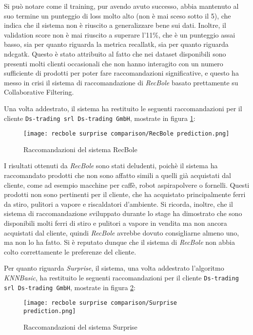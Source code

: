 Si può notare come il training, pur avendo avuto successo, abbia mantenuto al suo termine un punteggio di loss molto alto (non è mai sceso sotto il 5), che indica che il sistema non è riuscito a generalizzare bene sui dati. Inoltre, il validation score non è mai riuscito a superare l'11\%, che è un punteggio assai basso, sia per quanto riguarda la metrica \gls{recallatk}, sia per quanto riguarda \gls{ndcgatk}. Questo è stato attribuito al fatto che nei dataset disponibili sono presenti molti clienti occasionali che non hanno interagito con un numero sufficiente di prodotti per poter fare raccomandazioni significative, e questo ha messo in crisi il sistema di raccomandazione di \emph{RecBole} basato prettamente su Collaborative Filtering.

Una volta addestrato, il sistema ha restituito le seguenti raccomandazioni per il cliente \texttt{Ds-trading srl Ds-trading GmbH}, mostrate in figura \ref{fig:recbole-recommendations}:

\begin{figure}[h]
    \centering
    \texttt{[image: recbole surprise comparison/RecBole prediction.png]}
    \caption{Raccomandazioni del sistema RecBole}
    \label{fig:recbole-recommendations}
\end{figure}

I risultati ottenuti da \emph{RecBole} sono stati deludenti, poichè il sistema ha raccomandato prodotti che non sono affatto simili a quelli già acquistati dal cliente, come ad esempio macchine per caffè, robot aspirapolvere o fornelli. Questi prodotti non sono pertinenti per il cliente, che ha acquistato principalmente ferri da stiro, pulitori a vapore e riscaldatori d'ambiente. Si ricorda, inoltre, che il sistema di raccomandazione sviluppato durante lo stage ha dimostrato che sono disponibili molti ferri di stiro e pulitori a vapore in vendita ma non ancora acquistati dal cliente, quindi \emph{RecBole} avrebbe dovuto consigliarne almeno uno, ma non lo ha fatto. Si è reputato dunque che il sistema di \emph{RecBole} non abbia colto correttamente le preferenze del cliente.

Per quanto riguarda \emph{Surprise}, il sistema, una volta addestrato l'algoritmo \emph{KNNBasic}, ha restituito le seguenti raccomandazioni per il cliente \texttt{Ds-trading srl Ds-trading GmbH}, mostrate in figura \ref{fig:surprise-recommendations}:

\begin{figure}[h]
    \centering
    \texttt{[image: recbole surprise comparison/Surprise prediction.png]}
    \caption{Raccomandazioni del sistema Surprise}
    \label{fig:surprise-recommendations}
\end{figure}

